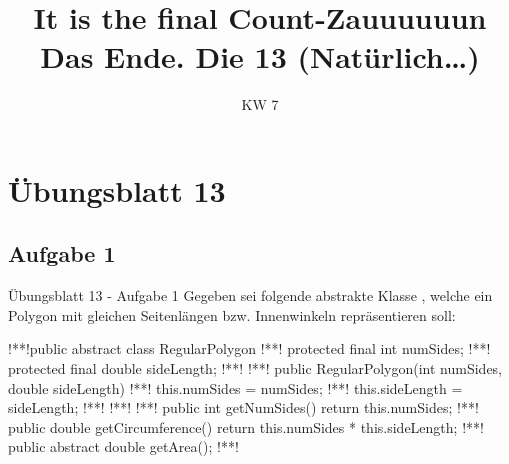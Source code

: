 \relax\relax

\iffull
\def\smlll{\texorpdfstring{\def\RSsmallest{2pt}\smaller[2]}{}}
\title[Dreizehntes Tutorium -- Übungsblatt 13]{It is the final Count-Zauuuuuun\\\small Das Ende. Die 13 (Natürlich\ldots)}
\date{\sffamily KW 7}

\usepackage[glows]{tikzpingus}
\usetikzlibrary{decorations.text,matrix}
\hypersetup{colorlinks=false}


\fi

\section{Übungsblatt 13}
\subsection{Aufgabe 1}

\iffull
\begin{frame}[c,fragile]{Übungsblatt 13 - Aufgabe 1}
%
\pause Gegeben sei folgende abstrakte Klasse , welche ein Polygon mit gleichen Seitenlängen bzw. Innenwinkeln repräsentieren soll:
\begin{plainjava}[morekeywords={[3]{RegularPolygon}}]
!**!public abstract class RegularPolygon {
!**!    protected final int numSides;
!**!    protected final double sideLength;
!**!
!**!    public RegularPolygon(int numSides, double sideLength) {
!**!        this.numSides = numSides;
!**!        this.sideLength = sideLength;
!**!    }
!**!
!**!    public int getNumSides() { return this.numSides; }
!**!    public double getCircumference() { return this.numSides * this.sideLength; }
!**!    public abstract double getArea();
!**!}
\end{plainjava}
\end{frame}

